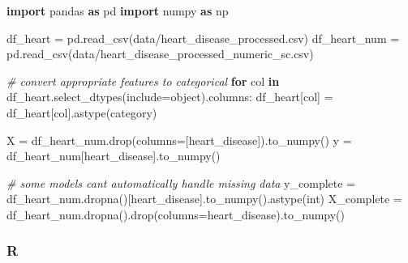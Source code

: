 \documentclass[
  letterpaper,
]{krantz}
\newenvironment{Shaded}{}{}
\newcommand{\BuiltInTok}[1]{\textcolor[rgb]{0.00,0.50,0.00}{#1}}
\newcommand{\CommentTok}[1]{\textcolor[rgb]{0.38,0.63,0.69}{\textit{#1}}}
\newcommand{\ControlFlowTok}[1]{\textcolor[rgb]{0.00,0.44,0.13}{\textbf{#1}}}
\newcommand{\ImportTok}[1]{\textcolor[rgb]{0.00,0.50,0.00}{\textbf{#1}}}
\newcommand{\KeywordTok}[1]{\textcolor[rgb]{0.00,0.44,0.13}{\textbf{#1}}}
\newcommand{\NormalTok}[1]{#1}
\newcommand{\OperatorTok}[1]{\textcolor[rgb]{0.40,0.40,0.40}{#1}}
\newcommand{\StringTok}[1]{\textcolor[rgb]{0.25,0.44,0.63}{#1}}
\begin{document}
\begin{Shaded}
\begin{Highlighting}[]
\ImportTok{import}\NormalTok{ pandas }\ImportTok{as}\NormalTok{ pd}
\ImportTok{import}\NormalTok{ numpy }\ImportTok{as}\NormalTok{ np}

\NormalTok{df\_heart }\OperatorTok{=}\NormalTok{ pd.read\_csv(}\StringTok{\textquotesingle{}data/heart\_disease\_processed.csv\textquotesingle{}}\NormalTok{)}
\NormalTok{df\_heart\_num }\OperatorTok{=}\NormalTok{ pd.read\_csv(}\StringTok{\textquotesingle{}data/heart\_disease\_processed\_numeric\_sc.csv\textquotesingle{}}\NormalTok{)}

\CommentTok{\# convert appropriate features to categorical}
\ControlFlowTok{for}\NormalTok{ col }\KeywordTok{in}\NormalTok{ df\_heart.select\_dtypes(include}\OperatorTok{=}\StringTok{\textquotesingle{}object\textquotesingle{}}\NormalTok{).columns:}
\NormalTok{    df\_heart[col] }\OperatorTok{=}\NormalTok{ df\_heart[col].astype(}\StringTok{\textquotesingle{}category\textquotesingle{}}\NormalTok{)}

\NormalTok{X }\OperatorTok{=}\NormalTok{ df\_heart\_num.drop(columns}\OperatorTok{=}\NormalTok{[}\StringTok{\textquotesingle{}heart\_disease\textquotesingle{}}\NormalTok{]).to\_numpy()}
\NormalTok{y }\OperatorTok{=}\NormalTok{ df\_heart\_num[}\StringTok{\textquotesingle{}heart\_disease\textquotesingle{}}\NormalTok{].to\_numpy()}

\CommentTok{\# some models can\textquotesingle{}t automatically handle missing data}
\NormalTok{y\_complete }\OperatorTok{=}\NormalTok{ df\_heart\_num.dropna()[}\StringTok{\textquotesingle{}heart\_disease\textquotesingle{}}\NormalTok{].to\_numpy().astype(}\BuiltInTok{int}\NormalTok{)}
\NormalTok{X\_complete }\OperatorTok{=}\NormalTok{ df\_heart\_num.dropna().drop(columns}\OperatorTok{=}\StringTok{\textquotesingle{}heart\_disease\textquotesingle{}}\NormalTok{).to\_numpy()}
\end{Highlighting}
\end{Shaded}

\subsubsection{R}
\end{document}
